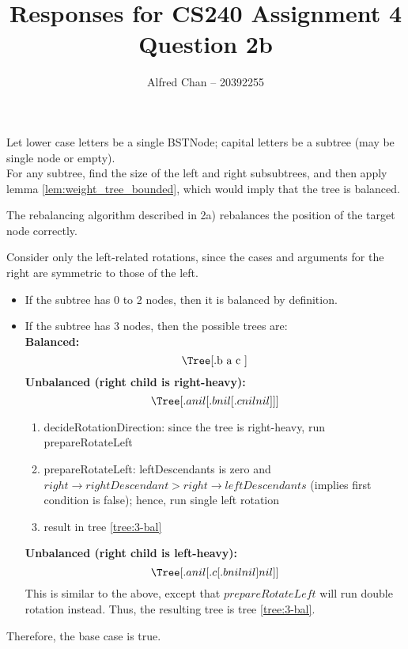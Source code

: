 \documentclass[12pt]{article}
\title{Responses for CS240 Assignment 4 Question 2b}
\author{Alfred Chan -- 20392255}
\begin{document}
\maketitle
{} Let lower case letters be a single BSTNode; capital letters be a subtree (may be single node or empty).\\

 For any subtree, find the size of the left and right subsubtrees, and then apply lemma \ref{lem:weight_tree_bounded}, which would imply that the tree is balanced.



\begin{claim}
The rebalancing algorithm described in 2a) rebalances the position of the target node correctly.
\end{claim}

 Consider only the left-related rotations, since the cases and arguments for the right are symmetric to those of the left.

\begin{itemize}
\item
If the subtree has 0 to 2 nodes, then it is balanced by definition.
\item
If the subtree has 3 nodes, then the possible trees are:\\
{\bf Balanced:}\\
\begin{equation}\label{tree:3-bal}
\text{\Tree[.b a c ]}\\ 
\end{equation}
{\bf Unbalanced (right child is right-heavy):}\\
\begin{equation}\label{tree:3-rh}
\Tree[.a nil [.b nil [.c nil nil ] ] ]\\
\end{equation}
\begin{enumerate}
	\item decideRotationDirection: since the tree is right-heavy, run prepareRotateLeft
	\item prepareRotateLeft: leftDescendants is zero and $right\rightarrow rightDescendant > right\rightarrow leftDescendants$ (implies first condition is false); hence, run single left rotation
	\item result in tree \ref{tree:3-bal}
\end{enumerate}

{\bf Unbalanced (right child is left-heavy):}\\
\begin{equation}\label{tree:3-rh}
\Tree[.a nil [.c [.b nil nil ] nil ] ]\\
\end{equation}
This is similar to the above, except that $prepareRotateLeft$ will run double rotation instead. Thus, the resulting tree is tree \ref{tree:3-bal}.\\
\end{itemize}
Therefore, the base case is true.\\
\end{document}
